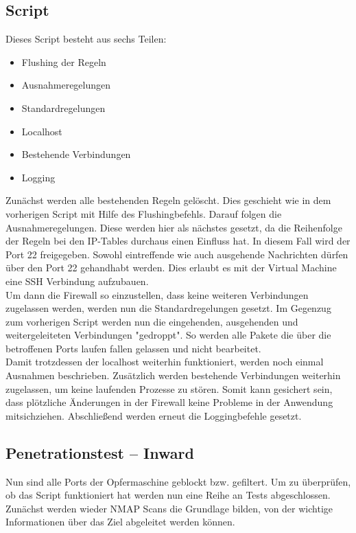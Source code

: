 \subsection{Script}
Dieses Script besteht aus sechs Teilen: 
\begin{itemize}
	\item Flushing der Regeln
	\item Ausnahmeregelungen
	\item Standardregelungen
	\item Localhost
	\item Bestehende Verbindungen
	\item Logging
\end{itemize}
Zunächst werden alle bestehenden Regeln gelöscht. Dies geschieht wie in dem vorherigen Script mit Hilfe des Flushingbefehls. Darauf folgen die Ausnahmeregelungen. Diese werden hier als nächstes gesetzt, da die Reihenfolge der Regeln bei den IP-Tables durchaus einen Einfluss hat. In diesem Fall wird der Port 22 freigegeben. Sowohl eintreffende wie auch ausgehende Nachrichten dürfen über den Port 22 gehandhabt werden. Dies erlaubt es mit der Virtual Machine eine SSH Verbindung aufzubauen. \\
Um dann die Firewall so einzustellen, dass keine weiteren Verbindungen zugelassen werden, werden nun die Standardregelungen gesetzt. Im Gegenzug zum vorherigen Script werden nun die eingehenden, ausgehenden und weitergeleiteten Verbindungen "gedroppt". So werden alle Pakete die über die betroffenen Ports laufen fallen gelassen und nicht bearbeitet. \\
Damit trotzdessen der localhost weiterhin funktioniert, werden noch einmal Ausnahmen beschrieben.
Zusätzlich werden bestehende Verbindungen weiterhin zugelassen, um keine laufenden Prozesse zu stören. Somit kann gesichert sein, dass plötzliche Änderungen in der Firewall keine Probleme in der Anwendung mitsichziehen. 
Abschließend werden erneut die Loggingbefehle gesetzt.

\newpage



\newpage



\subsection{Penetrationstest – Inward}
Nun sind alle Ports der Opfermaschine geblockt bzw. gefiltert. Um zu überprüfen, ob das Script funktioniert hat werden nun eine Reihe an Tests abgeschlossen. Zunächst werden wieder NMAP Scans die Grundlage bilden, von der wichtige Informationen über das Ziel abgeleitet werden können.

